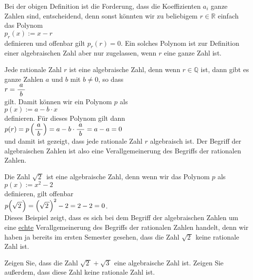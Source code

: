 Bei der obigen Definition ist die Forderung, dass die Koeffizienten $a_i$ ganze Zahlen sind, entscheidend,
denn sonst k\"onnten wir zu beliebigem $r \in \mathbb{R}$ einfach das Polynom
\\[0.2cm]
\hspace*{1.3cm}
$p_r(x) := x - r$
\\[0.2cm]
definieren und offenbar gilt $p_r(r) = 0$.  Ein solches Polynom ist zur Definition einer algebraischen
Zahl aber nur zugelassen, wenn $r$ eine ganze Zahl ist. \eod

\example
Jede rationale Zahl $r$ ist eine algebraische Zahl, denn wenn $r \in \mathbb{Q}$ ist, dann gibt es
ganze Zahlen $a$ und $b$ mit $b \not= 0$, so dass
\\[0.2cm]
\hspace*{1.3cm}
$r = \displaystyle\frac{\;\displaystyle a\;}{\;\displaystyle b\;}$
\\[0.2cm]
gilt.  Damit k\"onnen wir ein Polynom $p$ als
\\[0.2cm]
\hspace*{1.3cm}
$p(x) := a - b \cdot x$
\\[0.2cm]
definieren.  F\"ur dieses Polynom gilt dann
\\[0.2cm]
\hspace*{1.3cm}
$p(r) = p\left(\displaystyle\frac{\;\displaystyle a\;}{\;\displaystyle b\;}\right) = a - b \cdot \displaystyle\frac{\;\displaystyle a\;}{\;\displaystyle b\;} = a - a = 0$
\\[0.2cm]
und damit ist gezeigt, dass jede rationale Zahl $r$ algebraisch ist.  Der Begriff der algebraischen
Zahlen ist also eine Verallgemeinerung des Begriffs der rationalen Zahlen.  \eod

\example
Die Zahl $\sqrt{2\,}$ ist eine algebraische Zahl, denn wenn wir das Polynom $p$ als
\\[0.2cm]
\hspace*{1.3cm}
$p(x) := x^2 - 2$
\\[0.2cm]
definieren, gilt offenbar
\\[0.2cm]
\hspace*{1.3cm}
$p\Bigl(\sqrt{2\,}\Bigr) = \Bigl(\sqrt{2\,}\Bigr)^2 - 2 = 2 - 2 = 0$.  
\\[0.2cm]
Dieses Beispiel zeigt, dass es sich bei dem Begriff der algebraischen Zahlen um eine \underline{echte} 
Verallgemeinerung des Begriffs der rationalen Zahlen handelt, denn wir haben ja bereits im ersten
Semester gesehen, dass die Zahl $\sqrt{2\,}$ keine rationale Zahl ist.
\eod

\exercises
Zeigen Sie, dass die Zahl $\sqrt{2\,} + \sqrt{3\,}$ eine algebraische Zahl ist.  Zeigen Sie au{\ss}erdem,
dass diese Zahl keine rationale Zahl ist.  \eox

